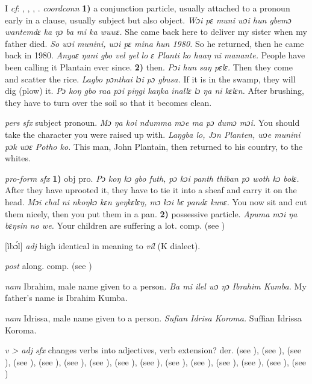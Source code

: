 \begin{letter}{I}
 \textit{cf}: , , , . \textit{coordconn} \textbf{1)} a conjunction particle, usually attached to a pronoun early in a clause, usually subject but also object. \textit{Wɔi pɛ muni wɔi hun gbemɔ wantemdɛ ka ŋɔ ba mi ka wuwɛ.} She came back here to deliver my sister when my father died. \textit{So wɔi munini, wɔi pɛ mina hun 1980.} So he returned, then he came back in 1980. \textit{Anyaɛ ŋani gbo vel yel lo ɛ Planti ko haaŋ ni manante.} People have been calling it Plantain ever since. \textbf{2)} then. \textit{Pɔi hun saŋ pɛlɛ.} Then they come and scatter the rice. \textit{Lagbo pɔnthai lɔi pɔ gbusa.} If it is in the swamp, they will dig (plow) it. \textit{Pɔ koŋ gbo raa pɔi piŋgi kaŋka inallɛ lɔ ŋa ni kɛlɛn.} After brushing, they have to turn over the soil so that it becomes clean.

 \textit{pers} \textit{sfx} subject pronoun. \textit{Mɔ ŋa koi ndumma mɔe ma pɔ dumɔ mɔi.} You should take the character you were raised up with. \textit{Laŋgba lo, Jɔn Planten, wɔe munini pɔk wɔɛ Potho ko.} This man, John Plantain, then returned to his country, to the whites.

 \textit{pro-form} \textit{sfx} \textbf{1)} obj pro. \textit{Pɔ koŋ kɔ gbo futh, pɔ kɔi panth thiban pɔ woth kɔ bolɛ.} After they have uprooted it, they have to tie it into a sheaf and carry it on the head. \textit{Mɔi chal ni nkoŋkɔ kɛn yeŋkɛlɛŋ, mɔ kɔi bɛ pandɛ kunɛ.} You now sit and cut them nicely, then you put them in a pan. \textbf{2)} possessive particle. \textit{Apuma mɔi ŋa bɛŋsin no we.} Your children are suffering a lot. comp.  (see ) 

 [ìbɔ́l] \textit{adj} high identical in meaning to \textit{víl} (K dialect). 

 \textit{post} along. comp.  (see ) 

 \textit{nam} Ibrahim, male name given to a person. \textit{Ba mi ilel wɔ ŋɔ Ibrahim Kumba.} My father's name is Ibrahim Kumba.

 \textit{nam} Idrissa, male name given to a person. \textit{Sufian Idrisa Koroma.} Suffian Idrissa Koroma.

 \textit{v > adj} \textit{sfx} changes verbs into adjectives, verb extension? der.  (see ),  (see ),  (see ),  (see ),  (see ),  (see ),  (see ),  (see ),  (see ),  (see ),  (see ),  (see ),  (see ),  (see ),  (see )


\end{letter}
